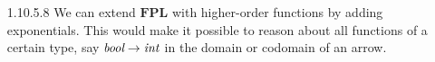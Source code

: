 \documentclass{article}
\newcommand{\fpl}{\mathbf{FPL}}
\begin{document}
\begin{enumerate}
\vfill{}
\item [1.10.5.8]
  We can extend $\fpl$ with higher-order functions by adding exponentials.
  This would make it possible to reason about all functions of a certain type, say $\emph{bool} \rightarrow \emph{int}$ in the domain or codomain of an arrow.
  
\end{enumerate}
\end{document}
